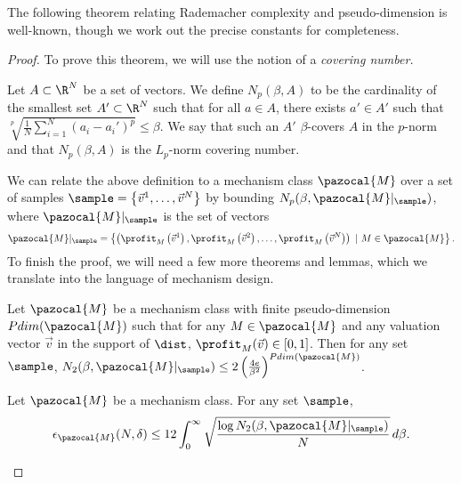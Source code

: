 The following theorem relating Rademacher complexity and pseudo-dimension is well-known, though we work out the precise constants for completeness.

\pseudimerad*

\begin{proof} To prove this theorem, we will use the notion of a \emph{covering number.}
\begin{definition}
Let $A \subset \R^N$ be a set of vectors. We define $N_p(\beta,A)$ to be the cardinality of the smallest set $A' \subset \R^N$ such that for all $a \in A$, there exists $a' \in A'$ such that $\sqrt[p]{\frac{1}{N}\sum_{i = 1}^N (a_i - a_i')^p} \leq \beta$. We say that such an $A'$ $\beta$-covers $A$ in the $p$-norm and that $N_p(\beta,A)$ is the $L_p$-norm covering number.
\end{definition}
 We can relate the above definition to a mechanism class $\pazocal{M}$ over a set of samples $\sample = \left\{\vec{v}^1, \dots, \vec{v}^N\right\}$ by bounding $N_p(\beta, \pazocal{M}|_{\sample})$, where $\pazocal{M}|_{\sample}$ is the set of vectors \[\pazocal{M}|_{\sample} = \left\{\left(\profit_M\left(\vec{v}^1\right), \profit_M\left(\vec{v}^2\right), \dots, \profit_M\left(\vec{v}^N\right)\right) \ | \ M \in \pazocal{M}\right\}.\] To finish the proof, we will need a few more theorems and lemmas, which we translate into the language of mechanism design.

\begin{theorem}\label{thm:pdim_covering}
Let $\pazocal{M}$ be a mechanism class with finite pseudo-dimension $Pdim(\pazocal{M})$ such that for any $M \in \pazocal{M}$ and any valuation vector $\vec{v}$ in the support of $\dist$, $\profit_M(\vec{v}) \in [0,1]$. Then for any set $\sample$, $N_2(\beta, \pazocal{M}|_{\sample}) \leq 2\left(\frac{4e}{\beta^2}\right)^{Pdim(\pazocal{M})}$.
\end{theorem}

\begin{theorem}\label{thm:dudley}
Let $\pazocal{M}$ be a mechanism class. For any set $\sample$, \[\epsilon_{\pazocal{M}}(N, \delta) \leq 12 \int_0^{\infty} \sqrt{\frac{\log N_2(\beta, \pazocal{M}|_{\sample})}{N}} \, d\beta.\]
\end{theorem}


\end{proof}
